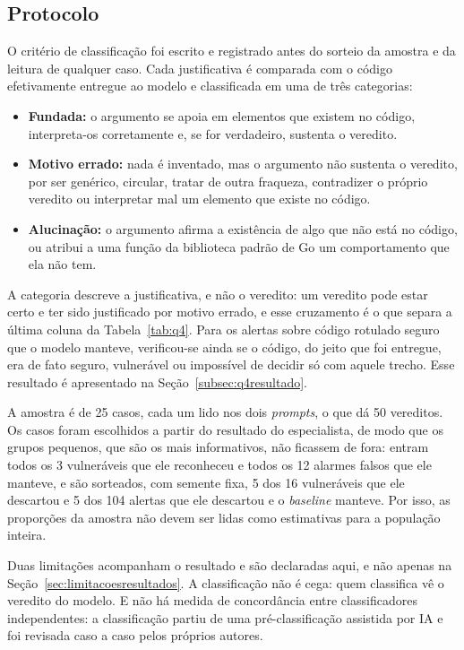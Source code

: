 \subsection{Protocolo}
\label{subsec:q4protocolo}

O critério de classificação foi escrito e registrado antes do sorteio da amostra e da leitura de qualquer caso. Cada justificativa é comparada com o código efetivamente entregue ao modelo e classificada em uma de três categorias:
\begin{itemize}
    \item \textbf{Fundada:} o argumento se apoia em elementos que existem no código, interpreta-os corretamente e, se for verdadeiro, sustenta o veredito.
    \item \textbf{Motivo errado:} nada é inventado, mas o argumento não sustenta o veredito, por ser genérico, circular, tratar de outra fraqueza, contradizer o próprio veredito ou interpretar mal um elemento que existe no código.
    \item \textbf{Alucinação:} o argumento afirma a existência de algo que não está no código, ou atribui a uma função da biblioteca padrão de Go um comportamento que ela não tem.
\end{itemize}

A categoria descreve a justificativa, e não o veredito: um veredito pode estar certo e ter sido justificado por motivo errado, e esse cruzamento é o que separa a última coluna da Tabela~\ref{tab:q4}. Para os alertas sobre código rotulado seguro que o modelo manteve, verificou-se ainda se o código, do jeito que foi entregue, era de fato seguro, vulnerável ou impossível de decidir só com aquele trecho. Esse resultado é apresentado na Seção~\ref{subsec:q4resultado}.

A amostra é de 25 casos, cada um lido nos dois \textit{prompts}, o que dá 50 vereditos. Os casos foram escolhidos a partir do resultado do especialista, de modo que os grupos pequenos, que são os mais informativos, não ficassem de fora: entram todos os 3 vulneráveis que ele reconheceu e todos os 12 alarmes falsos que ele manteve, e são sorteados, com semente fixa, 5 dos 16 vulneráveis que ele descartou e 5 dos 104 alertas que ele descartou e o \textit{baseline} manteve. Por isso, as proporções da amostra não devem ser lidas como estimativas para a população inteira.

Duas limitações acompanham o resultado e são declaradas aqui, e não apenas na Seção~\ref{sec:limitacoesresultados}. A classificação não é cega: quem classifica vê o veredito do modelo. E não há medida de concordância entre classificadores independentes: a classificação partiu de uma pré-classificação assistida por IA e foi revisada caso a caso pelos próprios autores.

